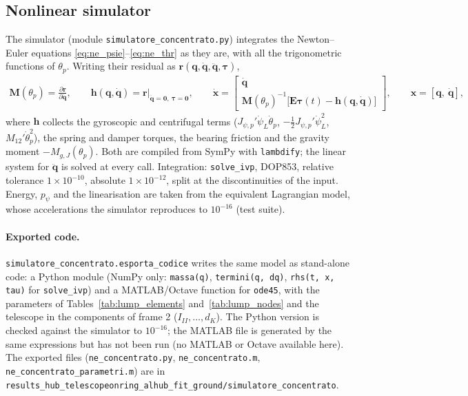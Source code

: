 \documentclass[10pt,a4paper]{article}
\numberwithin{equation}{section}
\begin{document}
\subsection{Nonlinear simulator}\label{subsec:lump_sim}
The simulator (module \texttt{simulatore\_concentrato.py}) integrates the Newton--Euler equations \eqref{eq:ne_psie}--\eqref{eq:ne_thr} as they are, with all the trigonometric functions of $\theta_p$. Writing their residual as $\mathbf r(\mathbf q, \dot{\mathbf q}, \ddot{\mathbf q}, \boldsymbol\tau)$,
\begin{gather}
\mathbf M(\theta_p) = \frac{\partial\mathbf r}{\partial\ddot{\mathbf q}},\qquad \mathbf h(\mathbf q, \dot{\mathbf q}) = \mathbf r\big|_{\ddot{\mathbf q} = \mathbf 0,\ \boldsymbol\tau = \mathbf 0},\qquad \dot{\mathbf x} = \begin{bmatrix}\dot{\mathbf q}\\ \mathbf M(\theta_p)^{-1}\bigl[\mathbf E\boldsymbol\tau(t) - \mathbf h(\mathbf q, \dot{\mathbf q})\bigr]\end{bmatrix},\qquad \mathbf x = [\mathbf q,\ \dot{\mathbf q}],
\end{gather}
where $\mathbf h$ collects the gyroscopic and centrifugal terms ($J_{\psi,p}'\dot\psi_L\dot\theta_p$, $-\tfrac12 J_{\psi,p}'\dot\psi_L^2$, $M_{12}'\dot\theta_p^2$), the spring and damper torques, the bearing friction and the gravity moment $-M_{g,J}(\theta_p)$. Both are compiled from SymPy with \texttt{lambdify}; the linear system for $\ddot{\mathbf q}$ is solved at every call. Integration: \texttt{solve\_ivp}, DOP853, relative tolerance $1\times10^{-10}$, absolute $1\times10^{-12}$, split at the discontinuities of the input. Energy, $p_\psi$ and the linearisation are taken from the equivalent Lagrangian model, whose accelerations the simulator reproduces to $10^{-16}$ (test suite).
\paragraph{Exported code.} \texttt{simulatore\_concentrato.esporta\_codice} writes the same model as stand-alone code: a Python module (NumPy only: \texttt{massa(q)}, \texttt{termini(q, dq)}, \texttt{rhs(t, x, tau)} for \texttt{solve\_ivp}) and a MATLAB/Octave function for \texttt{ode45}, with the parameters of Tables~\ref{tab:lump_elements} and~\ref{tab:lump_nodes} and the telescope in the components of frame 2 ($I_{II}, \dots, d_K$). The Python version is checked against the simulator to $10^{-16}$; the MATLAB file is generated by the same expressions but has not been run (no MATLAB or Octave available here). The exported files (\texttt{ne\_concentrato.py}, \texttt{ne\_concentrato.m}, \texttt{ne\_concentrato\_parametri.m}) are in \texttt{results\_hub\_telescopeonring\_alhub\_fit\_ground/simulatore\_concentrato}.
\end{document}
